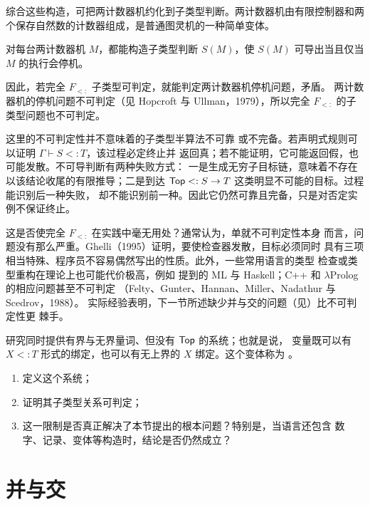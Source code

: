 综合这些构造，可把两计数器机约化到子类型判断。两计数器机由有限控制器和两
个保存自然数的计数器组成，是普通图灵机的一种简单变体。

\begin{theorem}[Pierce，1994]
\label{thm:28.5.5}
对每台两计数器机 \(M\)，都能构造子类型判断 \(S(M)\)，使
\(S(M)\) 可导出当且仅当 \(M\) 的执行会停机。
\end{theorem}

因此，若完全 \(F_{<:}\) 子类型可判定，就能判定两计数器机停机问题，矛盾。
两计数器机的停机问题不可判定（见 Hopcroft 与 Ullman，1979），所以完全
\(F_{<:}\) 的子类型问题也不可判定。

这里的不可判定性并不意味着的子类型半算法不可靠
或不完备。若声明式规则可以证明 \(\Gamma\vdash S<:T\)，该过程必定终止并
返回真；若不能证明，它可能返回假，也可能发散。不可导判断有两种失败方式：
一是生成无穷子目标链，意味着不存在以该结论收尾的有限推导；二是到达
\(\mathsf{Top}<:S\to T\) 这类明显不可能的目标。过程能识别后一种失败，
却不能识别前一种。因此它仍然可靠且完备，只是对否定实例不保证终止。

这是否使完全 \(F_{<:}\) 在实践中毫无用处？通常认为，单就不可判定性本身
而言，问题没有那么严重。Ghelli（1995）证明，要使检查器发散，目标必须同时
具有三项相当特殊、程序员不容易偶然写出的性质。此外，一些常用语言的类型
检查或类型重构在理论上也可能代价极高，例如
提到的 ML 与 Haskell；C++ 和 \(\lambda\)Prolog 的相应问题甚至不可判定
（Felty、Gunter、Hannan、Miller、Nadathur 与 Scedrov，1988）。
实际经验表明，下一节所述缺少并与交的问题（见）比不可判定性更
棘手。

\begin{exercise}[\(\star\star\star\star\)]
\label{ex:28.5.6}
研究同时提供有界与无界量词、但没有 \(\mathsf{Top}\) 的系统；也就是说，
变量既可以有 \(X<:T\) 形式的绑定，也可以有无上界的 \(X\) 绑定。这个变体称为
。
\begin{enumerate}
  \item 定义这个系统；
  \item 证明其子类型关系可判定；
  \item 这一限制是否真正解决了本节提出的根本问题？特别是，当语言还包含
        数字、记录、变体等构造时，结论是否仍然成立？
\end{enumerate}
\end{exercise}

\section{并与交}
\label{sec:28.6}

